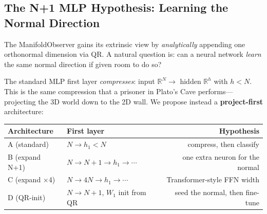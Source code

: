 \documentclass[12pt,letterpaper]{article}
\newcommand{\RR}{\mathbb{R}}
\begin{document}
\subsection{The N+1 MLP Hypothesis: Learning the Normal Direction}
\label{sec:n1mlp}

The ManifoldObserver gains its extrinsic view by \emph{analytically} appending
one orthonormal dimension via QR. A natural question is: can a neural network
\emph{learn} the same normal direction if given room to do so?

The standard MLP first layer \emph{compresses}: input $\RR^N \to$ hidden
$\RR^h$ with $h < N$.  This is the same compression that a prisoner in Plato's
Cave performs---projecting the 3D world down to the 2D wall.  We propose
instead a \textbf{project-first} architecture:

\begin{center}
\begin{tabular}{llr}
\toprule
Architecture & First layer & Hypothesis \\
\midrule
A (standard) & $N \to h_1 < N$ & compress, then classify \\
B (expand N+1) & $N \to N+1 \to h_1 \to \cdots$ & one extra neuron for the normal \\
C (expand $\times$4) & $N \to 4N \to h_1 \to \cdots$ & Transformer-style FFN width \\
D (QR-init) & $N \to N+1$, $W_1$ init from QR & seed the normal, then fine-tune \\
\bottomrule
\end{tabular}
\end{center}

\medskip
\end{document}
